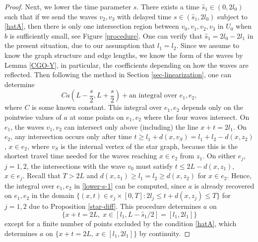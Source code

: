 \documentclass[11pt]{amsart}
\theoremstyle{definition}
\theoremstyle{plain}
\numberwithin{equation}{section}
\begin{document}
\begin{proof}
Next, we lower the time parameter $s$. There exists a time $\hat{s}_1 \in (0,2l_0)$ such that if we send the waves $v_2,v_3$ with delayed time $s\in (\hat{s}_1,2l_0)$ subject to \eqref{hatA},
then there is only one intersection region between $v_0,v_1,v_2,v_3$ in $U_0$ when $b$ is sufficiently small, see Figure \ref{procedure}.
One can verify that $\hat{s}_1=2l_0-2l_1$ in the present situation, due to our assumption that $l_1=l_2$.
Since we assume to know the graph structure and edge lengths, we know the form of the waves by Lemma \ref{CGO-Y}, in particular, the coefficients depending on how the waves are reflected.
Then following the method in Section \ref{sec-linearization}, one can determine
\begin{equation} \label{lower-s-1}
C  a(L-\frac{s}{2},L+\frac{s}{2}) + \textrm{an integral over }e_1,e_2,
\end{equation}
where $C$ is some known constant. 
This integral over $e_1,e_2$ depends only on the pointwise values of $a$ at some points on $e_1,e_2$ where the four waves intersect.
On $e_1$, the waves $v_1,v_2$ can intersect only above (including) the line $x+t=2l_1$.
On $e_2$, any intersection occurs only after time $t\geq l_1+d(x,v_S)=l_1+l_2-d(x,z_2)$, $x\in e_2$, where $v_S$ is the internal vertex of the star graph,
because this is the shortest travel time needed for the waves reaching $x\in e_2$ from $z_1$.
On either $e_j$, $j=1,2$, the intersections with the wave $v_0$ must satisfy $t\leq 2L-d(x,z_1)$, $x\in e_j$.
Recall that $T>2L$ and $d(x,z_1)\geq l_1=l_2\geq d(x,z_2)$ for $x\in e_2$.
Hence, the integral over $e_1,e_2$ in \eqref{lower-s-1} can be computed, since
$a$ is already recovered on $e_1,e_2$ in the domain $\{(x,t)\in e_j\times [0,T]: 2l_j\leq t+d(x,z_j)\leq T\}$ for $j=1,2$ due to Proposition \ref{star-diff}.
This procedure determines $a$ on 
$$\big\{x+t=2L, \; x\in [l_1, L-\hat{s}_1/2]=[l_1,2l_1]\big\}$$ 
except for a finite number of points excluded by the condition \eqref{hatA}, which determines $a$ on $\{x+t=2L,\, x\in [l_1, 2l_1]\}$ by continuity. 


\end{proof}
\end{document}
